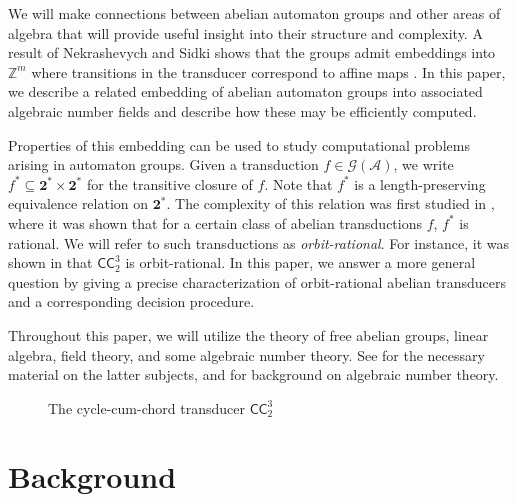 \documentclass[12pt, letterpaper]{article}
\newcommand{\Z}{\mathbb Z}
\newcommand{\bin}{\mathbf 2}
\newcommand{\A}{\mathcal A}
\newcommand{\CC}{\mathsf{CC}}
\newcommand{\gp}{\mathcal G}
\begin{document}
We will make connections between abelian automaton groups and other areas of
algebra that will provide useful insight into their structure and complexity.
A result of Nekrashevych and Sidki shows that the groups admit embeddings
into $\Z^m$ where transitions in the transducer correspond to affine maps
\cite{nekrashevych2004automorphisms}.  In this paper, we describe a related
embedding of abelian automaton groups into associated algebraic number fields
and describe how these may be efficiently computed.

Properties of this embedding can be used to study computational problems
arising in automaton groups. Given a transduction $f \in \gp(\A)$, we write
$f^* \subseteq \bin^* \times \bin^*$ for the transitive closure of $f$.  Note
that $f^*$ is a length-preserving equivalence relation on $\bin^*$.  The
complexity of this relation was first studied in \cite{jalc170214}, where it
was shown that for a certain class of abelian transductions $f$, $f^*$ is
rational. We will refer to such transductions as \emph{orbit-rational}. For
instance, it was shown in \cite{jalc170214} that $\CC^3_2$ is orbit-rational.
In this paper, we answer a more general question by giving a precise
characterization of orbit-rational abelian transducers and a corresponding
decision procedure.

Throughout this paper, we will utilize the theory of free abelian groups,
linear algebra, field theory, and some algebraic number theory. See
\cite{Hungerford78} for the necessary material on the latter subjects, and
\cite{ireland1990classical, stein2012algebraic} for background on algebraic
number theory.
\begin{figure}[hb]
    \centering
    \caption{The cycle-cum-chord transducer $\CC^3_2$}
    \label{fig:cc-3-2}
\end{figure}

\section{Background}
\end{document}
